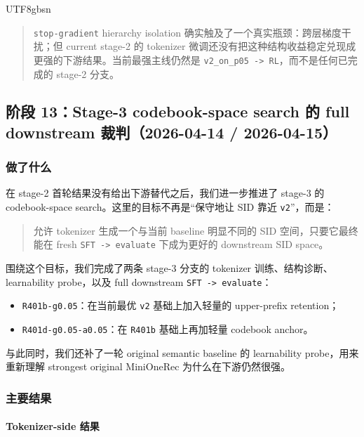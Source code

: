 \documentclass[11pt]{article}
\begin{document}
\begin{CJK*}{UTF8}{gbsn}
\begin{quote}
\texttt{stop-gradient} hierarchy isolation 确实触及了一个真实瓶颈：跨层梯度干扰；但 current stage-2 的 tokenizer 微调还没有把这种结构收益稳定兑现成更强的下游结果。当前最强主线仍然是 \texttt{v2\_on\_p05 -> RL}，而不是任何已完成的 stage-2 分支。
\end{quote}

\subsection{阶段 13：Stage-3 codebook-space search 的 full downstream 裁判（2026-04-14 / 2026-04-15）}

\subsubsection*{做了什么}

在 stage-2 首轮结果没有给出下游替代之后，我们进一步推进了 stage-3 的 codebook-space search。这里的目标不再是“保守地让 SID 靠近 \texttt{v2}”，而是：

\begin{quote}
允许 tokenizer 生成一个与当前 baseline 明显不同的 SID 空间，只要它最终能在 fresh \texttt{SFT -> evaluate} 下成为更好的 downstream SID space。
\end{quote}

围绕这个目标，我们完成了两条 stage-3 分支的 tokenizer 训练、结构诊断、learnability probe，以及 full downstream \texttt{SFT -> evaluate}：

\begin{itemize}
  \item \texttt{R401b-g0.05}：在当前最优 \texttt{v2} 基础上加入轻量的 upper-prefix retention；
  \item \texttt{R401d-g0.05-a0.05}：在 \texttt{R401b} 基础上再加轻量 codebook anchor。
\end{itemize}

与此同时，我们还补了一轮 original semantic baseline 的 learnability probe，用来重新理解 strongest original MiniOneRec 为什么在下游仍然很强。

\subsubsection*{主要结果}

\paragraph{Tokenizer-side 结果}


\end{CJK*}
\end{document}
